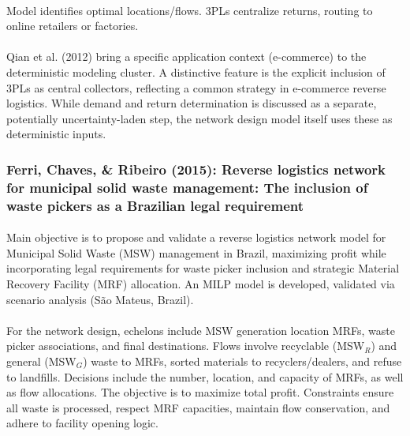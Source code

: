 \paragraph{} Model identifies optimal locations/flows. 3PLs centralize returns, routing to online retailers or factories.

\paragraph{} Qian et al. (2012) bring a specific application context (e-commerce) to the deterministic modeling cluster. A distinctive feature is the explicit inclusion of 3PLs as central collectors, reflecting a common strategy in e-commerce reverse logistics. While demand and return determination is discussed as a separate, potentially uncertainty-laden step, the network design model itself uses these as deterministic inputs.

\subsubsection{Ferri, Chaves, \& Ribeiro (2015): Reverse logistics network for municipal solid waste management: The inclusion of waste pickers as a Brazilian legal requirement}

\paragraph{} Main objective is to propose and validate a reverse logistics network model for Municipal Solid Waste (MSW) management in Brazil, maximizing profit while incorporating legal requirements for waste picker inclusion and strategic Material Recovery Facility (MRF) allocation. An MILP model is developed, validated via scenario analysis (São Mateus, Brazil).

\paragraph{} For the network design, echelons include MSW generation location MRFs, waste picker associations, and final destinations. Flows involve recyclable (MSW$_{R}$) and general (MSW$_{G}$) waste to MRFs, sorted materials to recyclers/dealers, and refuse to landfills. Decisions include the number, location, and capacity of MRFs, as well as flow allocations. The objective is to maximize total profit. Constraints ensure all waste is processed, respect MRF capacities, maintain flow conservation, and adhere to facility opening logic.

